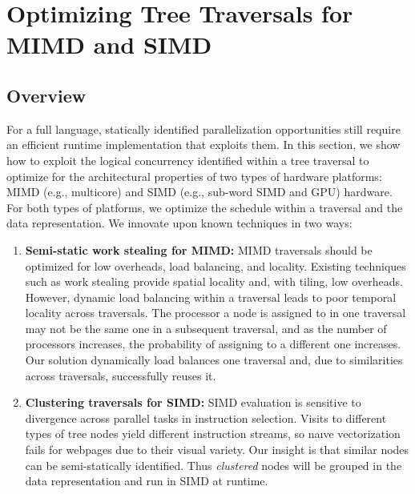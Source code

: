 \chapter{Optimizing Tree Traversals for MIMD and SIMD}
\section{Overview}

For a full language, statically identified parallelization opportunities still require an efficient runtime implementation that exploits them. In this section, we show how to exploit the logical concurrency identified within a tree traversal to optimize for the architectural properties of two types of hardware platforms: MIMD (e.g., multicore) and SIMD (e.g., sub-word SIMD and GPU) hardware. For both types of platforms, we optimize the schedule within a traversal and the data representation. We innovate upon known techniques in two ways:

\begin{enumerate}
\item \textbf{Semi-static work stealing for MIMD:} MIMD traversals should be optimized for low overheads, load balancing, and locality. Existing techniques such as work stealing provide spatial locality and, with tiling, low overheads. However, dynamic load balancing within a traversal leads to poor temporal locality across traversals. The processor a node is assigned to in one traversal may not be the same one in a subsequent traversal, and as the number of processors increases, the probability of assigning to a different one increases. Our solution dynamically load balances one traversal and, due to similarities across traversals, successfully reuses it.
\item \textbf{Clustering traversals for SIMD:}  SIMD evaluation is sensitive to divergence across parallel tasks in instruction selection. Visits to different types of tree nodes yield different instruction streams, so na\i{v}e vectorization fails for webpages due to their visual variety. Our insight is that similar nodes can be semi-statically identified. Thus \emph{clustered} nodes will be grouped in the data representation and run in SIMD at runtime.
\end{enumerate}

